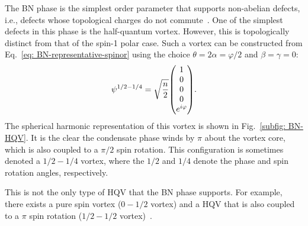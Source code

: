 The BN phase is the simplest order parameter that supports non-abelian defects,
i.e., defects whose topological charges do not commute~\cite{Mermin1979}.
One of the simplest defects in this phase is the half-quantum vortex.
However, this is topologically distinct from that of the spin-1 polar case.
Such a vortex can be constructed from Eq.~\eqref{eq: BN-representative-spinor}
using the choice \(\theta=2\alpha=\varphi/2\) and \(\beta=\gamma=0\):
\begin{equation}
    \psi^\mathrm{1/2-1/4} = \sqrt{\frac{n}{2}}\mqty(
    1 \\
    0 \\
    0 \\
    0 \\
    e^{i\varphi}
    ).
\end{equation}
The spherical harmonic representation of this vortex is shown in
Fig.~\ref{subfig: BN-HQV}.
It is the clear the condensate phase winds by \(\pi \) about the vortex core,
which is also coupled to a \(\pi / 2\) spin rotation.
This configuration is sometimes denoted a \(1/2-1/4\) vortex, where the \(1/2\)
and \(1/4\) denote the phase and spin rotation angles, respectively.

This is not the only type of HQV that the BN phase supports.
For example, there exists a pure spin vortex (\(0 - 1/2\) vortex) and a HQV
that is also coupled to a \(\pi \) spin rotation
(\(1/2-1/2\) vortex)~\cite{Kawaguchi2012}.

